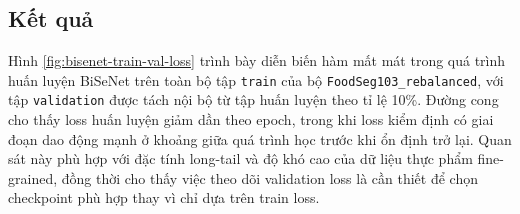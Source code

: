 \begin{table}[H]
    \centering
    \caption{Cấu hình tham số huấn luyện mô hình cơ sở BiSeNet.}
    \label{tab:bisenet-baseline-config}
\end{table}

\subsection{Kết quả}

Hình \ref{fig:bisenet-train-val-loss} trình bày diễn biến hàm mất mát trong quá trình huấn luyện BiSeNet trên toàn bộ tập \texttt{train} của bộ \texttt{FoodSeg103\_rebalanced}, với tập \texttt{validation} được tách nội bộ từ tập huấn luyện theo tỉ lệ 10\%. Đường cong cho thấy loss huấn luyện giảm dần theo epoch, trong khi loss kiểm định có giai đoạn dao động mạnh ở khoảng giữa quá trình học trước khi ổn định trở lại. Quan sát này phù hợp với đặc tính long-tail và độ khó cao của dữ liệu thực phẩm fine-grained, đồng thời cho thấy việc theo dõi validation loss là cần thiết để chọn checkpoint phù hợp thay vì chỉ dựa trên train loss.

